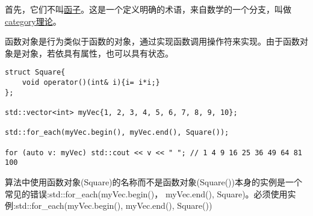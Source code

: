 首先，它们不叫\href{https://en.wikipedia.org/wiki/Functor}{函子}。这是一个定义明确的术语，来自数学的一个分支，叫做\href{https://en.wikipedia.org/wiki/Category_theory}{category理论}。

函数对象是行为类似于函数的对象，通过实现函数调用操作符来实现。由于函数对象是对象，若依具有属性，也可以具有状态。

\begin{lstlisting}[style=styleCXX]
struct Square{
	void operator()(int& i){i= i*i;}
};

std::vector<int> myVec{1, 2, 3, 4, 5, 6, 7, 8, 9, 10};

std::for_each(myVec.begin(), myVec.end(), Square());

for (auto v: myVec) std::cout << v << " "; // 1 4 9 16 25 36 49 64 81 100
\end{lstlisting}

\begin{tcolorbox}[breakable,enhanced jigsaw,colback=blue!5!white,colframe=blue!75!black,title={实例化函数对象}]
算法中使用函数对象(Square)的名称而不是函数对象(Square())本身的实例是一个常见的错误:std::for\_each(myVec.begin()， myVec.end(), Square)。必须使用实例:std::for\_each(myVec.begin(), myVec.end(), Square())
\end{tcolorbox}